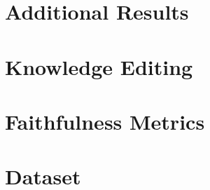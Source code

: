\section{Additional Results}
\label{appendix:results}



\section{Knowledge Editing}
\label{appendix:model_editing}


\section{Faithfulness Metrics}
\label{appendix:metrics}


\section{Dataset}
\label{appendix:dataset}


